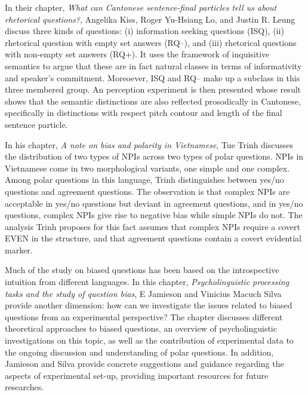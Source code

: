 \documentclass[output=paper,colorlinks,citecolor=brown]{langscibook}
\begin{document}
In their chapter, \textit{What can Cantonese sentence-final particles tell us about rhetorical questions?}, Angelika Kiss, Roger Yu-Hsiang Lo, and Justin R. Leung discuss three kinds of questions: (i) information seeking questions (ISQ), (ii) rhetorical question with empty set answers (RQ–), and (iii) rhetorical questions with non-empty set answers (RQ+). It uses the framework of inquisitive semantics to argue that these are in fact natural classes in terms of informativity and speaker's commitment. Moreoever, ISQ and RQ– make up a subclass in this three membered group. An perception experiment is then presented whose result shows that the semantic distinctions are also reflected prosodically in Cantonese, specifically in distinctions with respect pitch contour and length of the final sentence particle.

In his chapter, \textit{A note on bias and polarity in Vietnamese}, Tue Trinh discusses the distribution of two types of NPIs across two types of polar questions. NPIs in Vietnamese come in two morphological variants, one simple and one complex. Among polar questions in this language, Trinh distinguishes between yes/no questions and agreement questions. The observation is that complex NPIs are acceptable in yes/no questions but deviant in agreement questions, and in yes/no questions, complex NPIs give rise to negative bias while simple NPIs do not. The analysis Trinh proposes for this fact assumes that complex NPIs require a covert EVEN in the structure, and that agreement questions contain a covert evidential marker. 



Much of the study on biased questions has been based on the introspective intuition from different languages. In this chapter, \textit{Psycholinguistic processing tasks and the study of question bias}, E Jamieson and Vinicius Macuch Silva provide another dimension: how can we investigate the issues related to biased questions from an experimental perspective? The chapter discusses different theoretical approaches to biased questions, an overview of psycholinguistic investigations on this topic, as well as the contribution of experimental data to the ongoing discussion and understanding of polar questions. In addition, Jamieson and Silva provide concrete suggestions and guidance regarding the aspects of experimental set-up, providing important resources for future researches.
\end{document}

